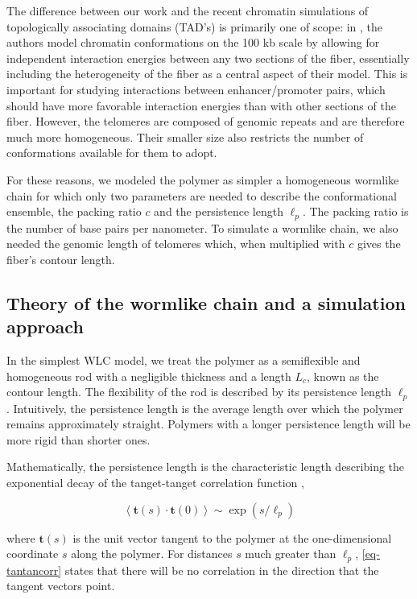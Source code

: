 \documentclass[11pt]{article}
\begin{document}
The difference between our work and the recent chromatin simulations
of topologically associating domains (TAD's) is primarily one of
scope: in \cite{giorgetti-cell-2014}, the authors model chromatin
conformations on the 100 kb scale by allowing for independent
interaction energies between any two sections of the fiber,
essentially including the heterogeneity of the fiber as a central
aspect of their model. This is important for studying interactions
between enhancer/promoter pairs, which should have more favorable
interaction energies than with other sections of the fiber. However,
the telomeres are composed of genomic repeats and are therefore much
more homogeneous. Their smaller size also restricts the number of
conformations available for them to adopt.

For these reasons, we modeled the polymer as simpler a homogeneous
wormlike chain for which only two parameters are needed to describe
the conformational ensemble, the packing ratio $c$ and the persistence
length $\ell_p$. The packing ratio is the number of base pairs per
nanometer. To simulate a wormlike chain, we also needed the genomic
length of telomeres which, when multiplied with $c$ gives the fiber's
contour length.

\subsection{Theory of the wormlike chain and a simulation approach}
\label{sec-3-1}
In the simplest WLC model, we treat the polymer as a semiflexible and
homogeneous rod with a negligible thickness and a length $L_c$, known
as the contour length. The flexibility of the rod is described by its
persistence length $\ell_p$. Intuitively, the persistence length is
the average length over which the polymer remains approximately
straight. Polymers with a longer persistence length will be more rigid
than shorter ones.

Mathematically, the persistence length is the characteristic length
describing the exponential decay of the tanget-tanget correlation
function \cite{phillips-pbotc-2009},

\begin{equation}
  \label{eq-tantancorr}
  \left< \mathbf{t} \left( s \right) \cdot \mathbf{t} \left( 0 \right) \right> \sim \exp \left( s / \ell_p \right)
\end{equation}

where $\mathbf{t} \left( s \right)$ is the unit vector tangent to the
polymer at the one-dimensional coordinate $s$ along the polymer. For
distances $s$ much greater than $\ell_p$, \eqref{eq-tantancorr}
states that there will be no correlation in the direction that the
tangent vectors point.
\end{document}
